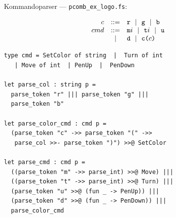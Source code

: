 \documentclass[rgb]{beamer}
\begin{document}
\begin{frame}[fragile]
\begin{footnotesize}
\begin{minipage}[t]{.7\textwidth}

  Kommandoparser  --- \lstinline{pcomb_ex_logo.fs}:
\end{minipage}
\begin{minipage}[t]{.25\textwidth}
  \[\begin{array}{rcl}
  c & ::= & \texttt{r} ~~|~~\texttt{g} ~~|~~\texttt{b} \\
  cmd & ::= & \texttt{m}i ~~|~~ \texttt{t}i ~~|~~ \texttt{u} \\
      &|& \texttt{d} ~~|~~ \texttt{c(}c\texttt{)}
  \end{array}
  \]
  \vspace{-1cm}
\end{minipage}

\begin{lstlisting}[numbers=none,frame=none,mathescape]
type cmd = SetColor of string  |  Turn of int
   | Move of int  | PenUp  |  PenDown

let parse_col : string p =
  parse_token "r" ||| parse_token "g" |||
  parse_token "b"

let parse_color_cmd : cmd p =
  (parse_token "c" ->> parse_token "(" ->>
   parse_col >>- parse_token ")") >>@ SetColor

let parse_cmd : cmd p =
  ((parse_token "m" ->> parse_int) >>@ Move) |||
  ((parse_token "t" ->> parse_int) >>@ Turn) |||
  (parse_token "u" >>@ (fun _ -> PenUp)) |||
  (parse_token "d" >>@ (fun _ -> PenDown)) |||
  parse_color_cmd
\end{lstlisting}

\end{footnotesize}
\end{frame}
\end{document}
